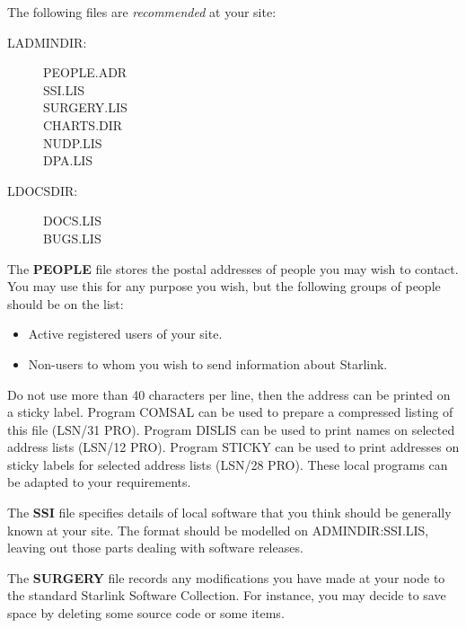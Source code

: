 The following files are {\em recommended} at your site:
\begin{description}
\begin{description}
\item [LADMINDIR:] \hfill
\begin{description}
\item [PEOPLE.ADR] \hfill
\item [SSI.LIS] \hfill
\item [SURGERY.LIS] \hfill
\item [CHARTS.DIR] \hfill
\item [NUDP.LIS] \hfill
\item [DPA.LIS] \hfill
\end{description}
\item [LDOCSDIR:] \hfill
\begin{description}
\item [DOCS.LIS] \hfill
\item [BUGS.LIS] \hfill
\end{description}
\end{description}
\end{description}
The {\bf PEOPLE} file stores the postal addresses of people you may wish to contact.
You may use this for any purpose you wish, but the following groups of people
should be on the list:
\begin{itemize}
\item Active registered users of your site.
\item Non-users to whom you wish to send information about Starlink.
\end{itemize}
Do not use more than 40 characters per line, then the address can be printed
on a sticky label.
Program COMSAL can be used to prepare a compressed listing of this file (LSN/31
PRO).
Program DISLIS can be used to print names on selected address lists (LSN/12
PRO).
Program STICKY can be used to print addresses on sticky labels for selected
address lists (LSN/28 PRO).
These local programs can be adapted to your requirements.

The {\bf SSI} file specifies details of local software that you think should be
generally known at your site.
The format should be modelled on ADMINDIR:SSI.LIS, leaving out those parts
dealing with software releases.

The {\bf SURGERY} file records any modifications you have made at your node to
the standard Starlink Software Collection.
For instance, you may decide to save space by deleting some source code or some
items.

